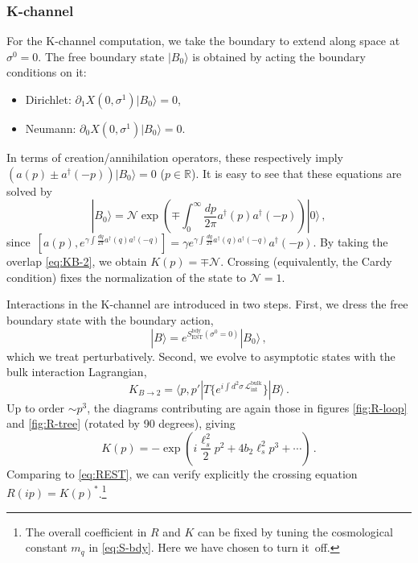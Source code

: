 \documentclass[
 reprint,
 amsmath,
 pre,
 amssymb,
 nofootinbib,
 aps,
 longbibliography,
]{revtex4-1}
\newcommand{\<}{{\langle}}
\renewcommand{\>}{{\rangle}}
\begin{document}
\subsubsection{K-channel}
For the K-channel computation, we take the boundary to extend along space at $\sigma^0=0$. The free boundary state $|B_0\rangle$ is obtained by acting the boundary conditions on it:
\begin{itemize}
    \item Dirichlet: $\partial_1 X(0, \sigma^1) |B_0\rangle =0$,
    \item Neumann: $\partial_0 X(0, \sigma^1) |B_0\rangle =0$.
\end{itemize}
In terms of creation/annihilation operators, these respectively imply $\left(a(p) \pm a^\dagger(-p)\right)|B_0\rangle = 0$ ($p\in \mathbb R$). It is easy to see that these equations are solved by
\begin{equation}
    |B_0\rangle = \mathcal N \exp\left(\mp\int_0^\infty \frac{dp}{2\pi} a^\dagger(p) a^\dagger(-p)\right)|0\rangle\,,
\end{equation}
since~${[a(p), e^{\gamma \int \frac{dq}{2\pi} a^\dagger(q) a^\dagger(-q)}] = \gamma e^{\gamma \int \frac{dq}{2\pi} a^\dagger(q) a^\dagger(-q)} a^\dagger(-p)}$. By taking the overlap \eqref{eq:KB-2}, we obtain $K(p) = \mp \mathcal N$. Crossing (equivalently, the Cardy condition) fixes the normalization of the state to $\mathcal N=1$.

Interactions in the K-channel are introduced in two steps. First, we dress the free boundary state with the boundary action,
\begin{equation}
    |B\rangle = e^{S_{\text{EST}}^\text{bdy}(\sigma^0=0)}|B_0\rangle\,,
\end{equation}
which we treat perturbatively. Second, we evolve to asymptotic states with the bulk interaction Lagrangian,
\begin{equation}
    K_{B\to 2} = \langle p,p'|T\big\{e^{i\int d^2 \sigma\, \mathcal L_\text{int}^\text{bulk}}\big\}|B\rangle\,.
\end{equation}
Up to order $\sim p^3$, the diagrams contributing are again those in figures \ref{fig:R-loop} and \ref{fig:R-tree} (rotated by 90 degrees), giving
\begin{equation}
    K(p) = -\exp\left( i \frac{\ell_s^2}{2}p^2 + 4b_2 \ell_s^2 p^3 + \cdots\right)\,.
\end{equation}
Comparing to \eqref{eq:REST}, we can verify explicitly the crossing equation $R(ip)=K(p)^*$.\footnote{The overall coefficient in $R$ and $K$ can be fixed by tuning the cosmological constant $m_q$ in \eqref{eq:S-bdy}. Here we have chosen to turn it~off.}
\end{document}
